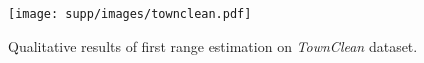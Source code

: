 \begin{figure}[t]
\centering
\texttt{[image: supp/images/townclean.pdf]}

\caption{Qualitative results of first range estimation on \textit{TownClean} dataset.}
\label{fig:iccv_supp_townclean}

\end{figure}